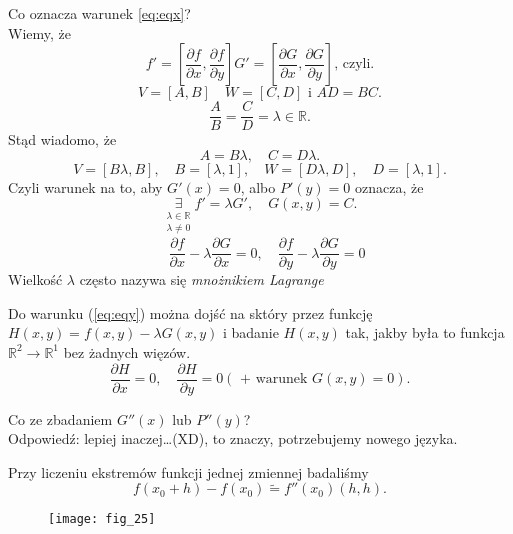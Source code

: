 \documentclass[../main.tex]{subfiles}
\begin{document}
    Co oznacza warunek \ref{eq:eqx}?\\
    Wiemy, że
    \[
        f' = \left[ \frac{\partial f}{\partial x} , \frac{\partial f}{\partial y}  \right] G' = \left[ \frac{\partial G}{\partial x} , \frac{\partial G}{\partial y}  \right]\text{, czyli}
    .\]
    \[
        V = \left[ A,B \right] \quad W = \left[ C,D \right] \text{ i } AD = BC
    .\]
    \[
    \frac{A}{B} = \frac{C}{D} = \lambda\in \mathbb{R}
    .\]
    Stąd wiadomo, że \[
    A = B\lambda, \quad C = D\lambda
    .\]
    \[
        V = \left[ B\lambda, B \right] ,\quad B = \left[ \lambda, 1 \right], \quad W = \left[ D\lambda, D \right], \quad D = \left[ \lambda, 1 \right]
    .\]
    Czyli warunek na to,  aby $G'(x) = 0$, albo  $P'(y) = 0$ oznacza, że \[
        \underset{\substack{\lambda\in\mathbb{R}\\ \lambda\neq 0}}{\exists} f' = \lambda G',  \quad G(x,y) = C
    .\]
    \begin{equation}\label{eq:eqy}
    \quad \frac{\partial f}{\partial x} - \lambda \frac{\partial G}{\partial x} = 0, \quad \frac{\partial f}{\partial y} - \lambda \frac{\partial G}{\partial y} = 0
    \end{equation}
    Wielkość $\lambda$ często nazywa się \textit{mnożnikiem Lagrange}

    \begin{obserwacja}
        Do warunku (\ref{eq:eqy}) można dojść na sktóry przez funkcję $H(x,y) = f(x,y) - \lambda G(x,y)$ i badanie $H(x,y)$ tak, jakby była to funkcja $\mathbb{R}^2\to \mathbb{R}^1$ bez żadnych więzów.\\
        \[
            \frac{\partial H}{\partial x} = 0, \quad \frac{\partial H}{\partial y} = 0 \left( \text{ + warunek } G(x,y) = 0 \right)
        .\]
    \end{obserwacja}
    \begin{pytanie}
        Co ze zbadaniem $G''(x)$ lub $P''(y)$?\\
        Odpowiedź: lepiej inaczej\ldots (XD), to znaczy, potrzebujemy nowego języka.
    \end{pytanie}

    Przy liczeniu ekstremów funkcji jednej zmiennej badaliśmy \[
        f(x_0+h) - f(x_0) \tilde = f''(x_0)(h,h)
    .\]

    \begin{figure}
        \centering
        \texttt{[image: fig\_25]}
        \caption{}
        \label{fig:fig_25}
    \end{figure}
\end{document}
